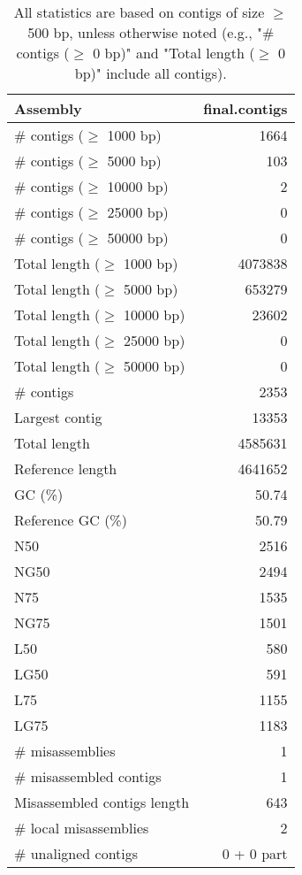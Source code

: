 \documentclass[12pt,a4paper]{article}
\begin{document}
\begin{table}[ht]
\begin{center}
\caption{All statistics are based on contigs of size $\geq$ 500 bp, unless otherwise noted (e.g., "\# contigs ($\geq$ 0 bp)" and "Total length ($\geq$ 0 bp)" include all contigs).}
\begin{tabular}{|l*{1}{|r}|}
\hline
Assembly & final.contigs \\ \hline
\# contigs ($\geq$ 1000 bp) & 1664 \\ \hline
\# contigs ($\geq$ 5000 bp) & 103 \\ \hline
\# contigs ($\geq$ 10000 bp) & 2 \\ \hline
\# contigs ($\geq$ 25000 bp) & 0 \\ \hline
\# contigs ($\geq$ 50000 bp) & 0 \\ \hline
Total length ($\geq$ 1000 bp) & 4073838 \\ \hline
Total length ($\geq$ 5000 bp) & 653279 \\ \hline
Total length ($\geq$ 10000 bp) & 23602 \\ \hline
Total length ($\geq$ 25000 bp) & 0 \\ \hline
Total length ($\geq$ 50000 bp) & 0 \\ \hline
\# contigs & 2353 \\ \hline
Largest contig & 13353 \\ \hline
Total length & 4585631 \\ \hline
Reference length & 4641652 \\ \hline
GC (\%) & 50.74 \\ \hline
Reference GC (\%) & 50.79 \\ \hline
N50 & 2516 \\ \hline
NG50 & 2494 \\ \hline
N75 & 1535 \\ \hline
NG75 & 1501 \\ \hline
L50 & 580 \\ \hline
LG50 & 591 \\ \hline
L75 & 1155 \\ \hline
LG75 & 1183 \\ \hline
\# misassemblies & 1 \\ \hline
\# misassembled contigs & 1 \\ \hline
Misassembled contigs length & 643 \\ \hline
\# local misassemblies & 2 \\ \hline
\# unaligned contigs & 0 + 0 part \\ \hline

\end{tabular}
\end{center}
\end{table}
\end{document}
